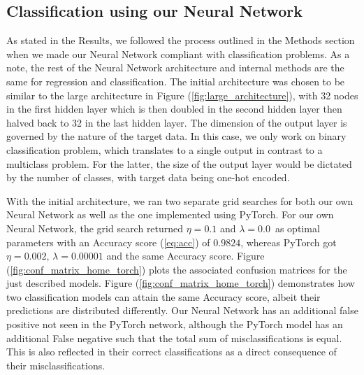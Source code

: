 \documentclass
[twocolumn,
secnumarabic,
nobibnotes,
aps,
prl,
reprint,
groupedaddress,
amsmath,
amssymb
]{revtex4-2}
\begin{document}
\subsection{Classification using our Neural Network}
As stated in the Results, we followed the process outlined in the Methods section when we made our Neural Network compliant with classification problems. As a note, the rest of the Neural Network architecture and internal methods are the same for regression and classification. The initial architecture was chosen to be similar to the large architecture in Figure (\ref{fig:large_architecture}), with 32 nodes in the first hidden layer which is then doubled in the second hidden layer then halved back to 32 in the last hidden layer. The dimension of the output layer is governed by the nature of the target data. In this case, we only work on binary classification problem, which translates to a single output in contrast to a multiclass problem. For the latter, the size of the output layer would be dictated by the number of classes, with target data being one-hot encoded. 

With the initial architecture, we ran two separate grid searches for both our own Neural Network as well as the one implemented using PyTorch. For our own Neural Network, the grid search returned $\eta=0.1$ and $\lambda = 0.0$ as optimal parameters with an Accuracy score (\ref{eq:acc}) of $0.9824$, whereas PyTorch got $\eta = 0.002$, $\lambda = 0.00001$ and the same Accuracy score. Figure (\ref{fig:conf_matrix_home_torch}) plots the associated confusion matrices for the just described models. Figure (\ref{fig:conf_matrix_home_torch}) demonstrates how two classification models can attain the same Accuracy score, albeit their predictions are distributed differently. Our Neural Network has an additional false positive not seen in the PyTorch network, although the PyTorch model has an additional False negative such that the total sum of misclassifications is equal. This is also reflected in their correct classifications as a direct consequence of their misclassifications. 
\end{document}
